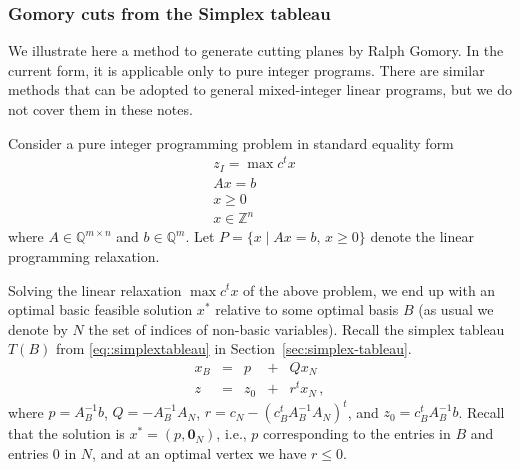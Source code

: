 \documentclass[12pt, showidx, twoside]{article}
\def\Q{\mathbb{Q}}
\def\Z{\mathbb{Z}}
\def\bn{\mathbf{0}}
\begin{document}
{{%



\subsubsection{Gomory cuts from the Simplex tableau}

We illustrate here a method to generate cutting planes by Ralph Gomory. In the current form, it is applicable only to pure integer
programs. There are similar methods that can be adopted to general
mixed-integer linear programs, but we do not cover them in these
notes.

Consider a pure integer programming problem in standard equality form
\begin{equation}\label{eq:gomory}
\begin{array}{cl}
z_I=\max c^t  x &\\
Ax=b&\\
x\geq 0\\
x\in\Z^n
\end{array}\end{equation}
where $A\in\Q^{m\times n}$ and $b\in\Q^m$. Let $P=\{x\mid Ax=b,\, x\geq 0\}$ denote the linear programming relaxation.

Solving the linear relaxation $\max c^t x$ of the above problem, we end up with an optimal basic feasible solution $x^*$ relative to some optimal basis $B$ (as usual we denote by $N$ the set of indices of non-basic variables). Recall the simplex tableau $T(B)$ from \eqref{eq::simplextableau} in Section~\ref{sec:simplex-tableau}.
\begin{equation} \label{eq::simplextableau-2}
\begin{array}{lclcc}
x_B & = & p   & + & Q x_N\\ \hline
z   & = & z_0 & + &r^t x_N\, ,
\end{array}
\end{equation} 
where $p=A_B^{-1} b$, $Q=-A_B^{-1}A_N$, $r = c_N - (c_B^t A_B^{-1} A_N)^t$,
and $z_0 = c_B^t A_B^{-1} b$. Recall that the solution is $x^*=(p,\bn_N)$, i.e.,  $p$ corresponding to the entries in $B$ and entries 0 in $N$, and at an optimal vertex we have  $r\le 0$.

}}
\end{document}
